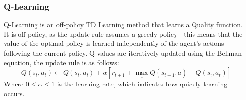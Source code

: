 

\subsubsection{Q-Learning}
Q-Learning \cite{Watkins:1989, journals/ml/WatkinsD92} is an off-policy TD Learning method that learns a Quality function. It is off-policy, as the update rule assumes a greedy policy - this means that the value of the optimal policy is learned independently of the agent's actions following the current policy. Q-values are iteratively updated using the Bellman equation, the update rule is as follows:
\begin{equation}
\label{eqn:qlearningupdate}
Q(s_t,a_t) \leftarrow Q(s_t,a_t) + \alpha[r_{t+1} + \max_aQ(s_{t+1}, a) -Q(s_t,a_t)]
\end{equation}
Where $0 \le \alpha \le 1$ is the learning rate, which indicates how quickly learning occurs.

